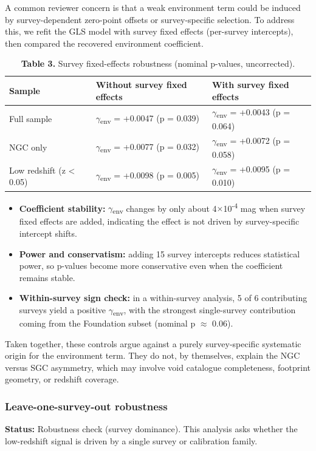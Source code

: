 \documentclass[11pt,a4paper]{article}
\begin{document}
A common reviewer concern is that a weak environment term could be induced by survey-dependent zero-point offsets or survey-specific selection.
To address this, we refit the GLS model with survey fixed effects (per-survey intercepts), then compared the recovered environment coefficient.

\begin{table}[H]
\centering
\footnotesize
\caption{\textbf{Table 3.} Survey fixed-effects robustness (nominal p-values, uncorrected).}
\begin{tabularx}{\linewidth}{l>{\RaggedRight\arraybackslash}X>{\RaggedRight\arraybackslash}X}
\toprule
\textbf{Sample} & \textbf{Without survey fixed effects} & \textbf{With survey fixed effects} \tabularnewline
\midrule
Full sample & $\gamma$\textsubscript{env} = +0.0047 (p = 0.039) & $\gamma$\textsubscript{env} = +0.0043 (p = 0.064) \tabularnewline
NGC only & $\gamma$\textsubscript{env} = +0.0077 (p = 0.032) & $\gamma$\textsubscript{env} = +0.0072 (p = 0.058) \tabularnewline
Low redshift (z < 0.05) & $\gamma$\textsubscript{env} = +0.0098 (p = 0.005) & $\gamma$\textsubscript{env} = +0.0095 (p = 0.010) \tabularnewline
\bottomrule
\end{tabularx}
\end{table}

\begin{itemize}
  \item \textbf{Coefficient stability:} $\gamma$\textsubscript{env} changes by only about 4$\times$10\textsuperscript{-4} mag when survey fixed effects are added, indicating the effect is not driven by survey-specific intercept shifts.
  \item \textbf{Power and conservatism:} adding 15 survey intercepts reduces statistical power, so p-values become more conservative even when the coefficient remains stable.
  \item \textbf{Within-survey sign check:} in a within-survey analysis, 5 of 6 contributing surveys yield a positive $\gamma$\textsubscript{env}, with the strongest single-survey contribution coming from the Foundation subset (nominal p $\approx$ 0.06).
\end{itemize}

Taken together, these controls argue against a purely survey-specific systematic origin for the environment term.
They do not, by themselves, explain the NGC versus SGC asymmetry, which may involve void catalogue completeness, footprint geometry, or redshift coverage.

\subsubsection{Leave-one-survey-out robustness}
\begin{mdframed}[linecolor=accent,linewidth=0.5pt,backgroundcolor=callout-bg,leftline=true,rightline=true,topline=true,bottomline=true,innerleftmargin=8pt,innerrightmargin=8pt,innertopmargin=6pt,innerbottommargin=6pt]
\textbf{Status:} Robustness check (survey dominance). This analysis asks whether the low-redshift signal is driven by a single survey or calibration family.
\end{mdframed}
\end{document}

